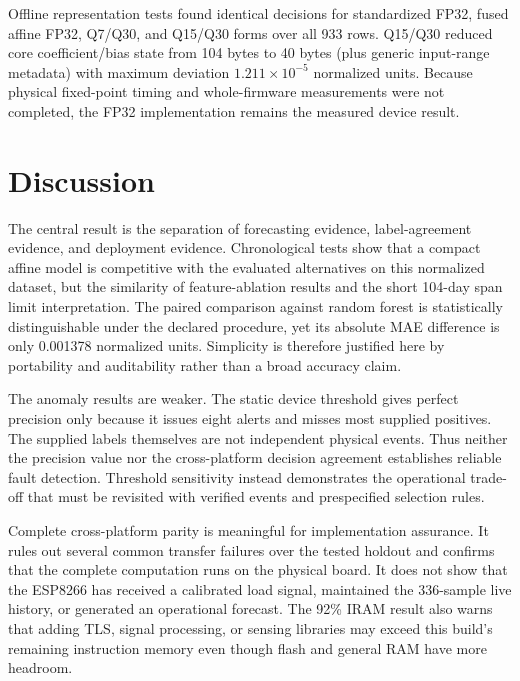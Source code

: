 \documentclass[10pt,a4paper,twocolumn]{article}
\begin{document}
Offline representation tests found identical decisions for standardized FP32, fused affine FP32, Q7/Q30, and Q15/Q30 forms over all 933 rows. Q15/Q30 reduced core coefficient/bias state from 104 bytes to 40 bytes (plus generic input-range metadata) with maximum deviation $1.211\times10^{-5}$ normalized units. Because physical fixed-point timing and whole-firmware measurements were not completed, the FP32 implementation remains the measured device result.

\section{Discussion}
The central result is the separation of forecasting evidence, label-agreement evidence, and deployment evidence. Chronological tests show that a compact affine model is competitive with the evaluated alternatives on this normalized dataset, but the similarity of feature-ablation results and the short 104-day span limit interpretation. The paired comparison against random forest is statistically distinguishable under the declared procedure, yet its absolute MAE difference is only 0.001378 normalized units. Simplicity is therefore justified here by portability and auditability rather than a broad accuracy claim.

The anomaly results are weaker. The static device threshold gives perfect precision only because it issues eight alerts and misses most supplied positives. The supplied labels themselves are not independent physical events. Thus neither the precision value nor the cross-platform decision agreement establishes reliable fault detection. Threshold sensitivity instead demonstrates the operational trade-off that must be revisited with verified events and prespecified selection rules.

Complete cross-platform parity is meaningful for implementation assurance. It rules out several common transfer failures over the tested holdout and confirms that the complete computation runs on the physical board. It does not show that the ESP8266 has received a calibrated load signal, maintained the 336-sample live history, or generated an operational forecast. The 92\% IRAM result also warns that adding TLS, signal processing, or sensing libraries may exceed this build's remaining instruction memory even though flash and general RAM have more headroom.
\end{document}
